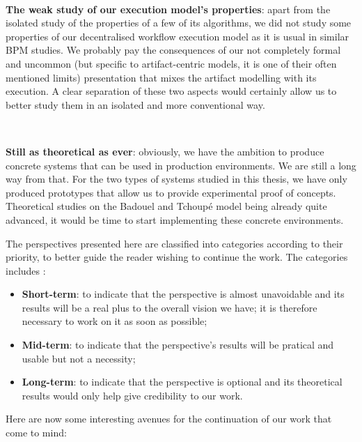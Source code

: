 ~

\noindent\textbf{The weak study of our execution model's properties}: apart from the isolated study of the properties of a few of its algorithms, we did not study some properties of our decentralised workflow execution model as it is usual in similar BPM studies. We probably pay the consequences of our not completely formal and uncommon (but specific to artifact-centric models, it is one of their often mentioned limits) presentation that mixes the artifact modelling with its execution. A clear separation of these two aspects would certainly allow us to better study them in an isolated and more conventional way.



~

\noindent\textbf{Still as theoretical as ever}: obviously, we have the ambition to produce concrete systems that can be used in production environments. We are still a long way from that. For the two types of systems studied in this thesis, we have only produced prototypes that allow us to provide experimental proof of concepts. Theoretical studies on the Badouel and Tchoup\'e model being already quite advanced, it would be time to start implementing these concrete environments.



The perspectives presented here are classified into categories according to their priority, to better guide the reader wishing to continue the work. The categories includes :
\begin{itemize}
	\item \textbf{Short-term}: to indicate that the perspective is almost unavoidable and its results will be a real plus to the overall vision we have; it is therefore necessary to work on it as soon as possible;
	\item \textbf{Mid-term}: to indicate that the perspective's results will be pratical and usable but not a necessity;
	\item \textbf{Long-term}: to indicate that the perspective is optional and its theoretical results would only help give credibility to our work.
\end{itemize}
Here are now some interesting avenues for the continuation of our work that come to mind:

~

